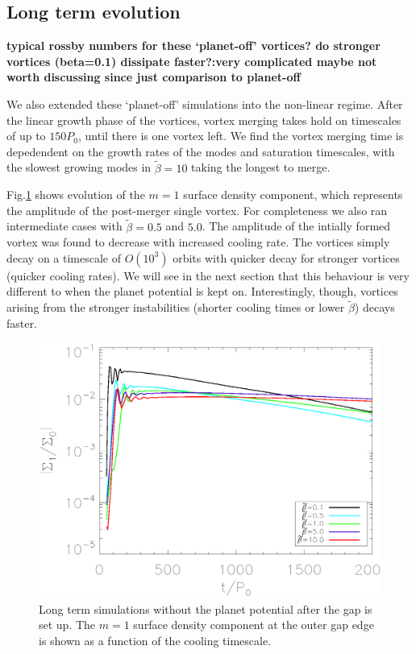 \subsection{Long term evolution} \label{nonlinearplanetoff} 
{\bf typical rossby numbers for these `planet-off' vortices? do
  stronger vortices (beta=0.1) dissipate faster?:very complicated
maybe not worth discussing since just comparison to planet-off}

We also extended these `planet-off' simulations into the non-linear
regime. After the linear growth phase of the vortices, vortex merging
takes hold on timescales of up to $150P_0$, until there is one vortex
left. We find the vortex merging
time is depedendent on the growth rates of the modes and saturation
timescales, with the slowest growing modes in $\tilde\beta=10$ taking
the longest to merge.  

Fig.\ref{planetofflifetimeplot} shows evolution of the $m=1$ surface
density component, which represents the amplitude of the post-merger
single vortex. For completeness we also ran intermediate cases with
$\tilde{\beta}=0.5$ and $5.0$. The amplitude of the intially formed vortex was 
found to decrease with increased cooling rate. The vortices simply decay on a
timescale of $O(10^3)$ orbits with quicker decay for stronger vortices
 (quicker cooling rates). We will see in the next section that
this behaviour is very different to when the planet potential is kept
on. Interestingly, though, vortices arising from the stronger
instabilities (shorter cooling times or lower $\tilde{\beta}$) decays
faster.   


\begin{figure}
  \includegraphics[width=\linewidth,clip=true,trim=0.5cm
  0cm 0cm 1.1cm]{figures/longterm_planetoff}
  \caption{Long term simulations without the planet potential after
    the gap is set up. The $m=1$ surface density component at the
    outer gap edge is shown as a function of the cooling timescale. 
  } \label{planetofflifetimeplot}
\end{figure}

